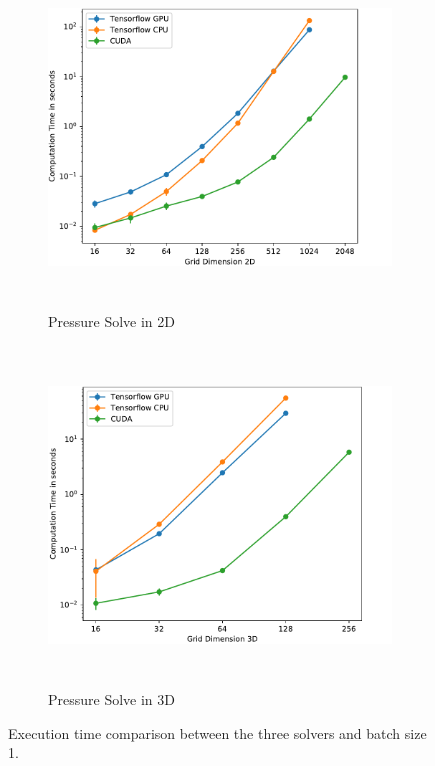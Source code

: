\begin{figure}[t]
\centering
	\begin{subfigure}[b]{1\textwidth}
		\centering
		\includegraphics[height=9cm, width=14cm]{figures/performance_2d_bs1}

		\caption{Pressure Solve in 2D}
	\end{subfigure}
	\begin{subfigure}[b]{1\textwidth}
		\centering
		\includegraphics[height=9cm, width=14cm]{figures/performance_3d_bs1}

		\caption{Pressure Solve in 3D}
	\end{subfigure}

\caption{Execution time comparison between the three solvers and batch size 1.}	
\end{figure}
